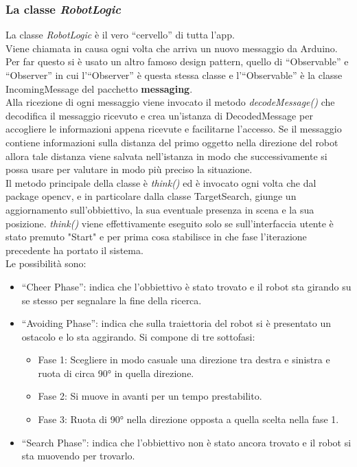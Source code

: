 \subsubsection{La classe \emph{RobotLogic}}
La classe \emph{RobotLogic} è il vero ``cervello'' di tutta l'app.\\
Viene chiamata in causa ogni volta che arriva un nuovo messaggio da Arduino. 
Per far questo si è usato un altro famoso design pattern, quello di ``Observable'' 
e ``Observer'' in cui l'``Observer'' è questa stessa classe e l'``Observable''
è la classe IncomingMessage del pacchetto \textbf{messaging}.\\
Alla ricezione di ogni messaggio viene invocato il metodo \emph{decodeMessage()}
che decodifica il messaggio ricevuto e crea un'istanza di DecodedMessage per 
accogliere le informazioni appena ricevute e facilitarne l'accesso. Se il messaggio
contiene informazioni sulla distanza del primo oggetto nella direzione del robot
allora tale distanza viene salvata nell'istanza in modo che successivamente si
possa usare per valutare in modo più preciso la situazione.\\
Il metodo principale della classe è \emph{think()} ed è invocato ogni volta che
dal package opencv, e in particolare dalla classe TargetSearch, giunge un aggiornamento
sull'obbiettivo, la sua eventuale presenza in scena e la sua posizione. \emph{think()}
viene effettivamente eseguito solo se sull'interfaccia utente è stato premuto "Start"
 e per prima cosa stabilisce in che fase l'iterazione precedente ha portato il sistema. \\
 Le possibilità sono:
	\begin{itemize}
	\item ``Cheer Phase'': indica che l'obbiettivo è stato trovato e il robot sta
	girando su se stesso per segnalare la fine della ricerca.
	\item ``Avoiding Phase'': indica che sulla traiettoria del robot si è presentato un ostacolo e lo sta aggirando. Si compone di tre sottofasi:
	\begin{itemize}
		\item Fase 1: Scegliere in modo casuale una direzione tra destra e sinistra e ruota di circa 90° in quella direzione. 
		\item Fase 2: Si muove in avanti per un tempo prestabilito.
		\item Fase 3: Ruota di 90° nella direzione opposta a quella scelta nella fase 1.
	\end{itemize}
	\item ``Search Phase'': indica che l'obbiettivo non è stato ancora trovato e il robot si sta muovendo per trovarlo.
	\end{itemize}

